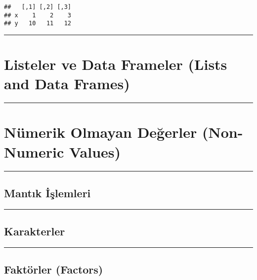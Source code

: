 \documentclass[
]{book}
\begin{document}
\begin{verbatim}
##   [,1] [,2] [,3]
## x    1    2    3
## y   10   11   12
\end{verbatim}

\begin{center}\rule{0.5\linewidth}{0.5pt}\end{center}

\hypertarget{listeler-ve-data-frameler-lists-and-data-frames}{%
\section{Listeler ve Data Frameler (Lists and Data Frames)}\label{listeler-ve-data-frameler-lists-and-data-frames}}

\begin{center}\rule{0.5\linewidth}{0.5pt}\end{center}

\hypertarget{nuxfcmerik-olmayan-deux11ferler-non-numeric-values}{%
\section{Nümerik Olmayan Değerler (Non-Numeric Values)}\label{nuxfcmerik-olmayan-deux11ferler-non-numeric-values}}

\begin{center}\rule{0.5\linewidth}{0.5pt}\end{center}

\hypertarget{mantux131k-iux15flemleri}{%
\subsection{Mantık İşlemleri}\label{mantux131k-iux15flemleri}}

\begin{center}\rule{0.5\linewidth}{0.5pt}\end{center}

\hypertarget{karakterler}{%
\subsection{Karakterler}\label{karakterler}}

\begin{center}\rule{0.5\linewidth}{0.5pt}\end{center}

\hypertarget{faktuxf6rler-factors}{%
\subsection{Faktörler (Factors)}\label{faktuxf6rler-factors}}
\end{document}

